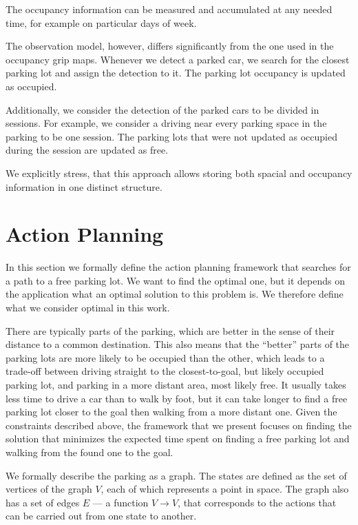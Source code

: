 The occupancy information can be measured and accumulated at any needed time,
for example on particular days of week.

The observation model, however, differs significantly from the one used in the
occupancy grip maps. Whenever we detect a parked car, we search for the
closest parking lot and assign the detection to it. The parking lot occupancy
is updated as occupied.

Additionally, we consider the detection of the parked cars to be divided in
sessions. For example, we consider a driving near every parking space in the
parking to be one session. The parking lots that were not updated as occupied
during the session are updated as free.

We explicitly stress, that this approach allows storing both spacial and
occupancy information in one distinct structure.


\section{Action Planning} %
\label{sec:action_planning}

In this section we formally define the action planning framework that searches
for a path to a free parking lot. We want to find the optimal one, but it
depends on the application what an optimal solution to this problem is. We
therefore define what we consider optimal in this work.

There are typically parts of the parking, which are better in the sense of
their distance to a common destination. This also means that the ``better''
parts of the parking lots are more likely to be occupied than the other, which
leads to a trade-off between driving straight to the closest-to-goal, but
likely occupied parking lot, and parking in a more distant area, most likely
free. It usually takes less time to drive a car than to walk by foot, but it
can take longer to find a free parking lot closer to the goal then walking
from a more distant one. Given the constraints described above, the framework
that we present focuses on finding the solution that minimizes the expected
time spent on finding a free parking lot and walking from the found one to the
goal.

We formally describe the parking as a graph. The states are defined as the set
of vertices of the graph $V$, each of which represents a point in space. The
graph also has a set of edges $E$ --- a function $V \rightarrow V$, that
corresponds to the actions that can be carried out from one state to another.

